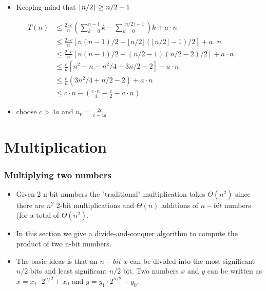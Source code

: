 \documentclass{beamer}
\DeclarePairedDelimiter\floor{\lfloor}{\rfloor}
\begin{document}
\begin{frame}
  \begin{itemize}
  \item Keeping mind that $\floor{n/2}\ge n/2-1$
  \end{itemize}
\begin{align*}
T(n)&\le \frac{2\cdot c}{n}	\left( \sum_{k=0}^{n-1}k-\sum_{k=0}^{\lfloor n/2\rfloor -1}\right)k+a\cdot n &\\
&\le \frac{2\cdot c}{n}\left[ n(n-1)/2-\lfloor n/2\rfloor(\lfloor n/2\rfloor -1)/2\right]+a\cdot n &\\
&\le \frac{2\cdot c}{n}\left[ n(n-1)/2-(n/2-1)(n/2-2)/2\right]+a\cdot n &\\
&\le \frac{c}{n}\left[n^2-n-n^2/4+3n/2-2     \right]+a\cdot n&\\
&\le \frac{c}{n} (3n^2/4+n/2-2)+ a\cdot n &\\
&\le c\cdot n-\left(\frac{c\cdot n}{4}-\frac{c}{2}-a\cdot n \right) &
\end{align*}
\begin{itemize}
\item choose $c>4a$ and $n_0=\frac{2c}{c-4a}$
\end{itemize}
\end{frame}

\section{Multiplication}
\begin{frame}
  \frametitle{Multiplying two numbers}
  \begin{itemize}
  \item Given 2 n-bit numbers the "traditional" multiplication takes $\Theta(n^2)$ since there are $n^2$ 2-bit multiplications and $\Theta(n)$ additions of $n-bit$ numbers (for a total of $\Theta(n^2)$.
\item In this section we give a divide-and-conquer algorithm to compute the product of two n-bit numbers.
\item The basic ideas is that an $n-bit$ $x$ can be divided into the most significant $n/2$ bits and least significant $n/2$ bit. Two numbers $x$ and $y$ can be written  as $x=x_1\cdot 2^{n/2}+x_0$ and $y=y_1\cdot 2^{n/2}+y_0$.
  \end{itemize}
\end{frame}
\end{document}
